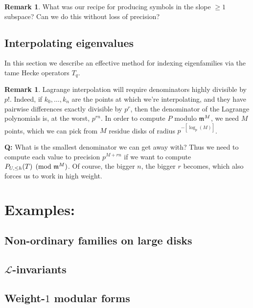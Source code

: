 \documentclass[12pt]{article}
\theoremstyle{definition}
\newtheorem{rem}[thm]{Remark}
\begin{document}
\begin{rem}
What was our recipe for producing symbols in the slope $\geq 1$ subspace? Can we do this without loss of precision?
\end{rem}

\subsection{Interpolating eigenvalues}
In this section we describe an effective method for indexing eigenfamilies via the tame Hecke operators $T_q$.

\begin{rem}
Lagrange interpolation will require denominators highly divisible by $p$!. Indeed, if $k_0,\ldots,k_n$ are the points at which we're interpolating, and they have pairwise differences exactly divisible by $p^r$, then the denominator of the Lagrange polynomials is, at the worst, $p^{rn}$. In order to compute $P$ modulo $\frak{m}^M$, we need $M$ points, which we can pick from $M$ residue disks of radius $p^{-[\log_p(M)]}$.


{\bf Q:} What is the smallest denominator we can get away with? 
Thus we need to compute each value to precision $p^{M+rn}$ if we want to compute $P_{U,\leq h}(T) \pmod{\frak{m}^M}$. Of course, the bigger $n$, the bigger $r$ becomes, which also forces us to work in high weight.
\end{rem}

\section{Examples:}
\subsection{Non-ordinary families on large disks}

\subsection{$\mathcal{L}$-invariants}

\subsection{Weight-$1$ modular forms}
\end{document}
